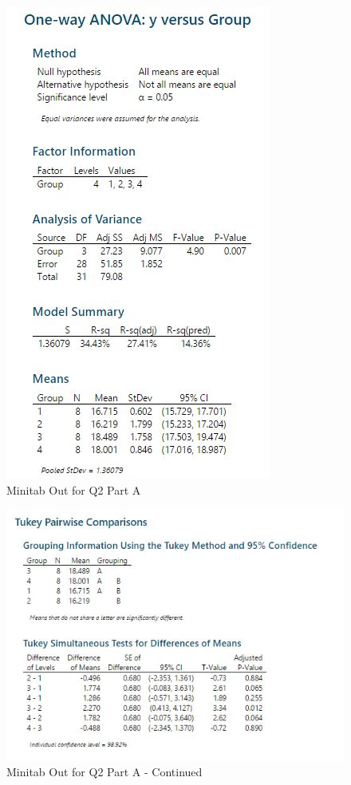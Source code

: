 \documentclass[a4paper,12pt]{article}
\begin{document}
\begin{figure}[h!]
\centering
\includegraphics[width=0.8\linewidth]{images/Repeat2017-Output}
\caption{Minitab Out for Q2 Part A}
\label{fig:Repeat2017-Output}
\end{figure}

\newpage
\begin{figure}[h!]
\centering
\includegraphics[width=1.1\linewidth]{images/Repeat2017-Output2}
\caption{Minitab Out for Q2 Part A - Continued}
\label{fig:Repeat2017-Output2}
\end{figure}
\end{document}
